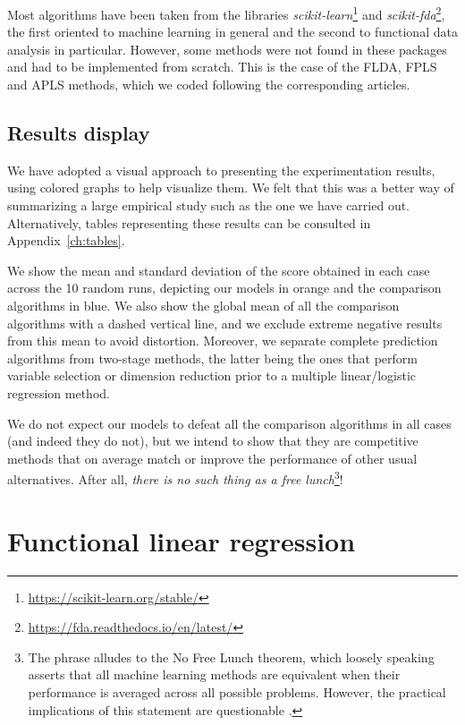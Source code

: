 Most algorithms have been taken from the libraries \textit{scikit-learn}\footnote{\url{https://scikit-learn.org/stable/}} and \textit{scikit-fda}\footnote{\url{https://fda.readthedocs.io/en/latest/}}, the first oriented to machine learning in general and the second to functional data analysis in particular. However, some methods were not found in these packages and had to be implemented from scratch. This is the case of the FLDA, FPLS and APLS methods, which we coded following the corresponding articles.

\subsection*{Results display}

We have adopted a visual approach to presenting the experimentation results, using colored graphs to help visualize them. We felt that this was a better way of summarizing a large empirical study such as the one we have carried out. Alternatively, tables representing these results can be consulted in Appendix~\ref{ch:tables}.

We show the mean and standard deviation of the score obtained in each case across the 10 random runs, depicting our models in orange and the comparison algorithms in blue. We also show the global mean of all the comparison algorithms with a dashed vertical line, and we exclude extreme negative results from this mean to avoid distortion. Moreover, we separate complete prediction algorithms from two-stage methods, the latter being the ones that perform variable selection or dimension reduction prior to a multiple linear/logistic regression method.

We do not expect our models to defeat all the comparison algorithms in all cases (and indeed they do not), but we intend to show that they are competitive methods that on average match or improve the performance of other usual alternatives. After all, \textit{there is no such thing as a free lunch}\footnote{The phrase alludes to the No Free Lunch theorem, which loosely speaking asserts that all machine learning methods are equivalent when their performance is averaged across all possible problems. However, the practical implications of this statement are questionable \citep[see e.g.][]{giraud2005toward}.}!

\section{Functional linear regression}\label{sec:experiments-linear}

